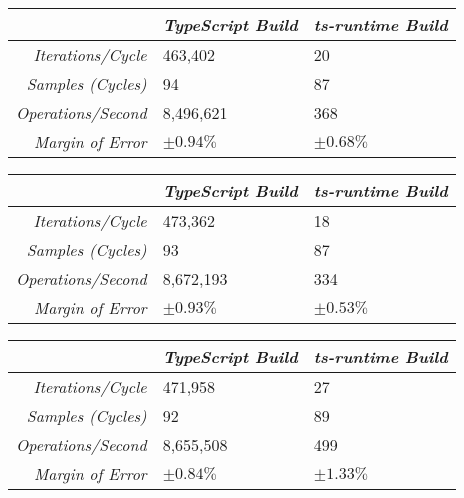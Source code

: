 \begin{center}
{
\centering
\tabulinesep=1.2mm
\setlength{\tabcolsep}{5mm}
\def\arraystretch{1.25}
\small
\begin{tabu} to \textwidth {|r||X[c,m]|X[c,m]|}
  \hline
  & \emph{TypeScript Build} & \emph{ts-runtime Build} \\
  \hline
  \hline
  \emph{Iterations/Cycle}  & 463,402 & 20 \\
  \hline
  \emph{Samples (Cycles)}  & 94 & 87 \\
  \hline
  \emph{Operations/Second} & 8,496,621 & 368 \\
  \hline
  \emph{Margin of Error}   & $\pm 0.94\%$ & $\pm 0.68\%$ \\
  \hline
\end{tabu}
}
\end{center}

\begin{center}
{
\centering
\tabulinesep=1.2mm
\setlength{\tabcolsep}{5mm}
\def\arraystretch{1.25}
\small
\begin{tabu} to \textwidth {|r||X[c,m]|X[c,m]|}
  \hline
  & \emph{TypeScript Build} & \emph{ts-runtime Build} \\
  \hline
  \hline
  \emph{Iterations/Cycle}  & 473,362 & 18 \\
  \hline
  \emph{Samples (Cycles)}  & 93 & 87 \\
  \hline
  \emph{Operations/Second} & 8,672,193 & 334 \\
  \hline
  \emph{Margin of Error}   & $\pm 0.93\%$ & $\pm 0.53\%$ \\
  \hline
\end{tabu}
}
\end{center}

\begin{center}
{
\centering
\tabulinesep=1.2mm
\setlength{\tabcolsep}{5mm}
\def\arraystretch{1.25}
\small
\begin{tabu} to \textwidth {|r||X[c,m]|X[c,m]|}
  \hline
  & \emph{TypeScript Build} & \emph{ts-runtime Build} \\
  \hline
  \hline
  \emph{Iterations/Cycle}  & 471,958 & 27 \\
  \hline
  \emph{Samples (Cycles)}  & 92 & 89 \\
  \hline
  \emph{Operations/Second} & 8,655,508 & 499 \\
  \hline
  \emph{Margin of Error}   & $\pm 0.84\%$ & $\pm 1.33\%$ \\
  \hline
\end{tabu}
}
\end{center}

